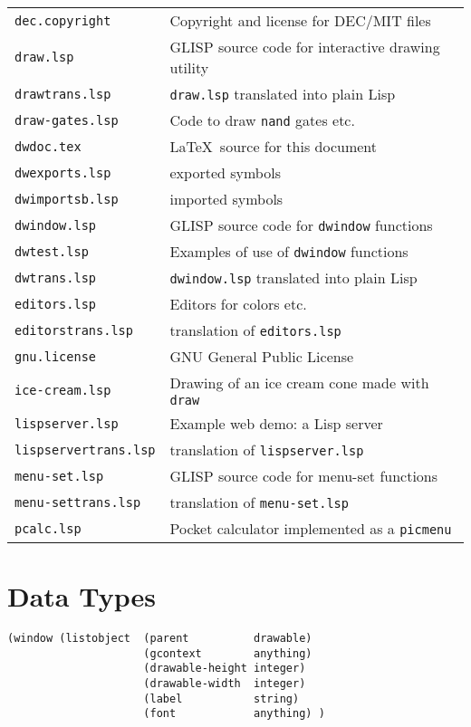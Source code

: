 \begin{tabular}{ll}
{\tt dec.copyright}  & Copyright and license for DEC/MIT files \\
{\tt draw.lsp}       & GLISP source code for interactive drawing utility \\
{\tt drawtrans.lsp}  & {\tt draw.lsp} translated into plain Lisp \\
{\tt draw-gates.lsp} & Code to draw {\tt nand} gates etc. \\
{\tt dwdoc.tex}      & \LaTeX \ source for this document \\
{\tt dwexports.lsp}  & exported symbols \\
{\tt dwimportsb.lsp} & imported symbols \\
{\tt dwindow.lsp}    & GLISP source code for {\tt dwindow} functions \\
{\tt dwtest.lsp}     & Examples of use of {\tt dwindow} functions \\
{\tt dwtrans.lsp}    & {\tt dwindow.lsp} translated into plain Lisp \\
{\tt editors.lsp}    & Editors for colors etc. \\
{\tt editorstrans.lsp}    & translation of {\tt editors.lsp} \\
{\tt gnu.license}    & GNU General Public License \\
{\tt ice-cream.lsp}  & Drawing of an ice cream cone made with {\tt draw} \\
{\tt lispserver.lsp} & Example web demo: a Lisp server \\
{\tt lispservertrans.lsp}    & translation of {\tt lispserver.lsp} \\
{\tt menu-set.lsp}   & GLISP source code for menu-set functions \\
{\tt menu-settrans.lsp}   & translation of {\tt menu-set.lsp} \\
{\tt pcalc.lsp}      & Pocket calculator implemented as a {\tt picmenu} \\
\end{tabular}


\pagebreak

\section{Data Types}

\begin{verbatim}
(window (listobject  (parent          drawable)
                     (gcontext        anything)
                     (drawable-height integer)
                     (drawable-width  integer)
                     (label           string)
                     (font            anything) )
\end{verbatim}

